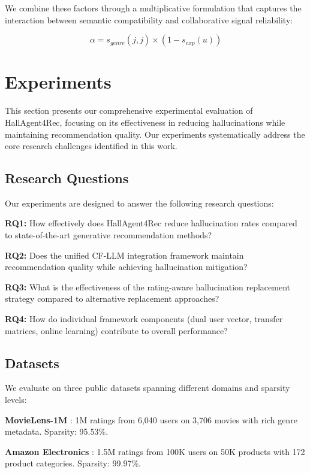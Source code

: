 \documentclass[acmsmall]{acmart}
\begin{document}
 We combine these factors through a multiplicative formulation that captures the interaction between semantic compatibility and collaborative signal reliability:

\begin{equation}
\alpha = s_{genre}(\hat{j}, j) \times (1 - s_{exp}(u))
\label{eq:theoretical_alpha}
\end{equation}

\section{Experiments}

This section presents our comprehensive experimental evaluation of HallAgent4Rec, focusing on its effectiveness in reducing hallucinations while maintaining recommendation quality. Our experiments systematically address the core research challenges identified in this work.

\subsection{Research Questions}
Our experiments are designed to answer the following research questions:

\textbf{RQ1:} How effectively does HallAgent4Rec reduce hallucination rates compared to state-of-the-art generative recommendation methods?

\textbf{RQ2:} Does the unified CF-LLM integration framework maintain recommendation quality while achieving hallucination mitigation?

\textbf{RQ3:} What is the effectiveness of the rating-aware hallucination replacement strategy compared to alternative replacement approaches?

\textbf{RQ4:} How do individual framework components (dual user vector, transfer matrices, online learning) contribute to overall performance?

\subsection{Datasets}
We evaluate on three public datasets spanning different domains and sparsity levels:

\textbf{MovieLens-1M} \cite{harper2015movielens}: 1M ratings from 6,040 users on 3,706 movies with rich genre metadata. Sparsity: 95.53\%.

\textbf{Amazon Electronics} \cite{he2016ups}: 1.5M ratings from 100K users on 50K products with 172 product categories. Sparsity: 99.97\%.
\end{document}
